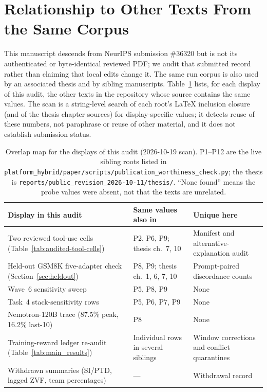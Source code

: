 \section{Relationship to Other Texts From the Same Corpus}
\label{sec:overlap}

This manuscript descends from NeurIPS submission \#36320 but is
not its authenticated or byte-identical reviewed PDF; we audit that submitted record
rather than claiming that local edits change it. The same run corpus is also
used by an associated thesis and by sibling manuscripts. Table~\ref{tab:overlap}
lists, for each display of this audit, the other texts in the repository whose
source contains the same values. The scan is a string-level search of each
root's \LaTeX{} inclusion closure (and of the thesis chapter sources) for
display-specific values; it detects reuse of these numbers, not paraphrase or
reuse of other material, and it does not establish submission status.

\begin{table}[htbp]
\centering\scriptsize
\caption{Overlap map for the displays of this audit (2026-10-19 scan). P1--P12
are the live sibling roots listed in
\texttt{platform\_hybrid/paper/scripts/publication\_worthiness\_check.py}; the
thesis is \texttt{reports/public\_revision\_2026-10-11/thesis/}. ``None found''
means the probe values were absent, not that the texts are unrelated.}
\label{tab:overlap}
\begin{tabular}{@{}p{.30\linewidth}p{.33\linewidth}p{.27\linewidth}@{}}
\toprule
Display in this audit & Same values also in & Unique here \\
\midrule
Two reviewed tool-use cells (Table~\ref{tab:audited-tool-cells}) & P2, P6, P9; thesis ch.~7, 10 & Manifest and alternative-explanation audit \\
Held-out GSM8K five-adapter check (Section~\ref{sec:heldout}) & P8, P9; thesis ch.~1, 6, 7, 10 & Prompt-paired discordance counts \\
Wave~6 sensitivity sweep & P5, P8, P9 & None \\
Task~4 stack-sensitivity rows & P5, P6, P7, P9 & None \\
Nemotron-120B trace (87.5\% peak, 16.2\% last-10) & P8 & None \\
Training-reward ledger re-audit (Table~\ref{tab:main_results}) & Individual rows in several siblings & Window corrections and conflict quarantines \\
Withdrawn summaries (SI/PTD, lagged ZVF, team percentages) & --- & Withdrawal record \\
\bottomrule
\end{tabular}
\end{table}

